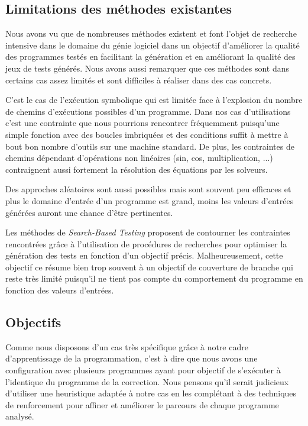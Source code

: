 \subsection{Limitations des méthodes existantes}
Nous avons vu que de nombreuses méthodes existent et font l'objet de recherche intensive dans le domaine du génie logiciel dans un objectif d'améliorer la qualité des programmes testés en facilitant la génération et en améliorant la qualité des jeux de tests générés. Nous avons aussi remarquer que ces méthodes sont dans certains cas assez limités et sont difficiles à réaliser dans des cas concrets.

C'est le cas de l'exécution symbolique qui est limitée face à l'explosion du nombre de chemins d'exécutions possibles d'un programme. Dans nos cas d'utilisations c'est une contrainte que nous pourrions rencontrer fréquemment puisqu'une simple fonction avec des boucles imbriquées et des conditions suffit à mettre à bout bon nombre d'outils sur une machine standard. De plus, les contraintes de chemins dépendant d'opérations non linéaires (sin, cos, multiplication, ...) contraignent aussi fortement la résolution des équations par les solveurs.

Des approches aléatoires sont aussi possibles mais sont souvent peu efficaces et plus le domaine d'entrée d'un programme est grand, moins les valeurs d'entrées générées auront une chance d'être pertinentes.

Les méthodes de \textit{Search-Based Testing} proposent de contourner les contraintes rencontrées grâce à l'utilisation de procédures de recherches pour optimiser la génération des tests en fonction d'un objectif précis. Malheureusement, cette objectif ce résume bien trop souvent à un objectif de couverture de branche qui reste très limité puisqu'il ne tient pas compte du comportement du programme en fonction des valeurs d'entrées.

\subsection{Objectifs}
Comme nous disposons d'un cas très spécifique grâce à notre cadre d'apprentissage de la programmation, c'est à dire que nous avons une configuration avec plusieurs programmes ayant pour objectif de s'exécuter à l'identique du programme de la correction. Nous pensons qu'il serait judicieux d'utiliser une heuristique adaptée à notre cas en les complétant à des techniques de renforcement pour affiner et améliorer le parcours de chaque programme analysé.

